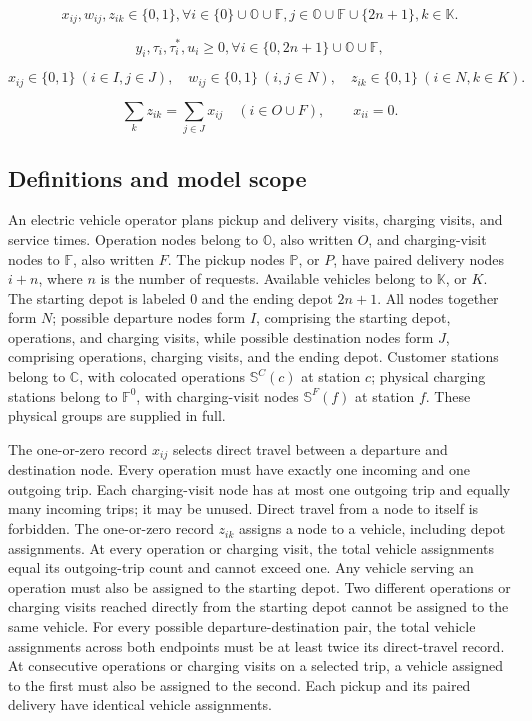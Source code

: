 \documentclass[10pt]{article}
\begin{document}
\begin{equation}
    \label{eq:28}
    x_{ij}, w_{ij}, z_{ik} \in \{0, 1\}, \forall i \in \{0\} \cup \mathbb{O} \cup \mathbb{F}, j \in \mathbb{O} \cup \mathbb{F} \cup \{2n + 1\}, k \in \mathbb{K}. \tag{28}
\end{equation}

\begin{equation}
    \label{eq:29}
    y_i, \tau_i, \tau_i^*, u_i \ge 0, \forall i \in \{0, 2n + 1\} \cup \mathbb{O} \cup \mathbb{F}, \tag{29}
\end{equation}

\[
x_{ij}\in\{0,1\}\ (i\in I,j\in J),\quad
w_{ij}\in\{0,1\}\ (i,j\in N),\quad z_{ik}\in\{0,1\}\ (i\in N,k\in K).
\]

\[
\sum_kz_{ik}=\sum_{j\in J}x_{ij}\quad(i\in O\cup F),\qquad x_{ii}=0.
\]

\subsection*{Definitions and model scope}
An electric vehicle operator plans pickup and delivery visits, charging visits, and service times. Operation nodes belong to $\mathbb O$, also written $O$, and charging-visit nodes to $\mathbb F$, also written $F$. The pickup nodes $\mathbb P$, or $P$, have paired delivery nodes $i+n$, where $n$ is the number of requests. Available vehicles belong to $\mathbb K$, or $K$. The starting depot is labeled $0$ and the ending depot $2n+1$. All nodes together form $N$; possible departure nodes form $I$, comprising the starting depot, operations, and charging visits, while possible destination nodes form $J$, comprising operations, charging visits, and the ending depot. Customer stations belong to $\mathbb C$, with colocated operations $\mathbb S^C(c)$ at station $c$; physical charging stations belong to $\mathbb F^0$, with charging-visit nodes $\mathbb S^F(f)$ at station $f$. These physical groups are supplied in full.

The one-or-zero record $x_{ij}$ selects direct travel between a departure and destination node. Every operation must have exactly one incoming and one outgoing trip. Each charging-visit node has at most one outgoing trip and equally many incoming trips; it may be unused. Direct travel from a node to itself is forbidden. The one-or-zero record $z_{ik}$ assigns a node to a vehicle, including depot assignments. At every operation or charging visit, the total vehicle assignments equal its outgoing-trip count and cannot exceed one. Any vehicle serving an operation must also be assigned to the starting depot. Two different operations or charging visits reached directly from the starting depot cannot be assigned to the same vehicle. For every possible departure-destination pair, the total vehicle assignments across both endpoints must be at least twice its direct-travel record. At consecutive operations or charging visits on a selected trip, a vehicle assigned to the first must also be assigned to the second. Each pickup and its paired delivery have identical vehicle assignments.
\end{document}
